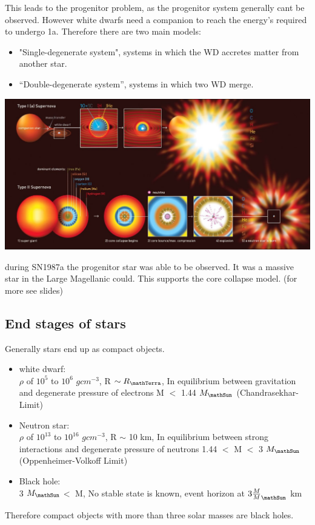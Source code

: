\documentclass[11pt,a4paper]{article}
\begin{document}
This leads to the progenitor problem, as the progenitor system generally cant be observed. 
However white dwarfs need a companion to reach the energy's required to undergo 1a. 
Therefore there are two main models:
\begin{itemize}
    \item "Single-degenerate system", systems in which the WD accretes matter from another star.
    \item “Double-degenerate system”, systems in which two WD merge. 
\end{itemize}
\begin{center}
    \includegraphics[width=0.9\linewidth]{screenshot_2024-01-24-105703.png}
\end{center}
during SN1987a the progenitor star was able to be observed. 
It was a massive star in the Large Magellanic could.
This supports the core collapse model. (for more see slides)

\subsection{End stages of stars}
Generally stars end up as compact objects. 
\begin{itemize}
    \item white dwarf: \\ 
    $\rho$ of $10^5$ to $10^6$ $gcm^{-3}$, R $\sim R_\mathTerra$, In equilibrium between gravitation and degenerate pressure of electrons
    M $<$ 1.44 $M_\mathSun$ (Chandrasekhar-Limit)
\item Neutron star:  \\ 
    $\rho$ of $10^{13}$ to $10^{16}$ $gcm^{-3}$, R $\sim$ 10 km, In equilibrium between strong interactions and degenerate pressure of neutrons
   1.44 $<$ M $<$ 3 $M_\mathSun$ (Oppenheimer-Volkoff Limit)
\item Black hole: \\ 
    3 $M_\mathSun$$<$ M, No stable state  is known, event horizon at $3 \frac M M_\mathSun$ km
\end{itemize}
Therefore compact objects with more than three solar masses are black holes.
\end{document}
